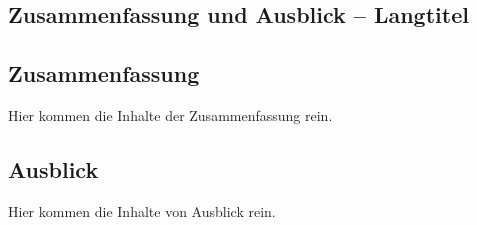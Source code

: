 \begin{showConclusion}%
%
\chapter[Zusammenfassung und Ausblick - Kurztitel für Inhaltsverzeichnis und Kolumnentitel]{Zusammenfassung und Ausblick -- Langtitel}%
\label{chap:Zusammenfassung}
%
%
\section[Zusammenfassung - Kurztitel für Inhaltsverzeichnis und Kolumnentitel]{Zusammenfassung}%
\label{sec:Conclusion}
%
Hier kommen die Inhalte der Zusammenfassung rein.
%
%

\begin{showOutlook}%
%
\section[Ausblick - Kurztitel für Inhaltsverzeichnis und Kolumnentitel]{Ausblick}%
\label{sec:Outlook}
%
Hier kommen die Inhalte von Ausblick rein.
%
%
\end{showOutlook}%
%
\end{showConclusion}%